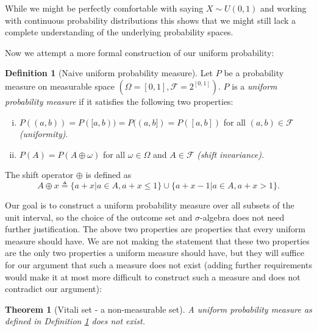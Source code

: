 \documentclass{book}
\theoremstyle{plain}%
\newtheorem{theorem}{Theorem}[section]
\theoremstyle{definition}
\newtheorem{definition}{Definition}[section]
\begin{document}
While we might be perfectly comfortable with saying $X \sim U(0,1)$ and working with continuous probability distributions  this shows that we might still lack a complete understanding of the underlying probability spaces.

Now we attempt a more formal construction of our uniform probability:

\begin{definition}[Naive uniform probability measure]
Let $P$ be a probability measure on measurable space $(\Omega = [0,1], \mathcal{F} = 2^{[0,1]})$. $P$ is a \emph{uniform probability measure} if it satisfies the following two properties:

\begin{enumerate}[(i)]
\item $P((a,b)) = P([a,b)) = P((a,b]) = P([a,b])$ for all $(a,b) \in \mathcal{F}$ \emph{(uniformity)}.
\item $P(A) = P(A \oplus \omega)$ for all $\omega \in \Omega$ and $A \in \mathcal{F}$ \emph{(shift invariance)}.
\end{enumerate}

The shift operator $\oplus$ is defined as $$A \oplus x \triangleq \{a + x|a \in A, a+ x \leq 1\} \cup \{a + x - 1|a \in A, a+ x > 1\}.$$\label{def:naive_uniform}
\end{definition}

Our goal is to construct a uniform probability measure over all subsets of the unit interval, so the choice of the outcome set and $\sigma$-algebra does not need further justification. The above two properties are properties that every uniform measure should have. We are not making the statement that these two properties are the only two properties a uniform measure should have, but they will suffice for our argument that such a measure does not exist (adding further requirements would make it at most more difficult to construct such a measure and does not contradict our argument):

\begin{theorem}[Vitali set - a non-measurable set]
A uniform probability measure as defined in Definition \ref{def:naive_uniform} does not exist.\label{thm:nonexistence}
\end{theorem}
\end{document}

